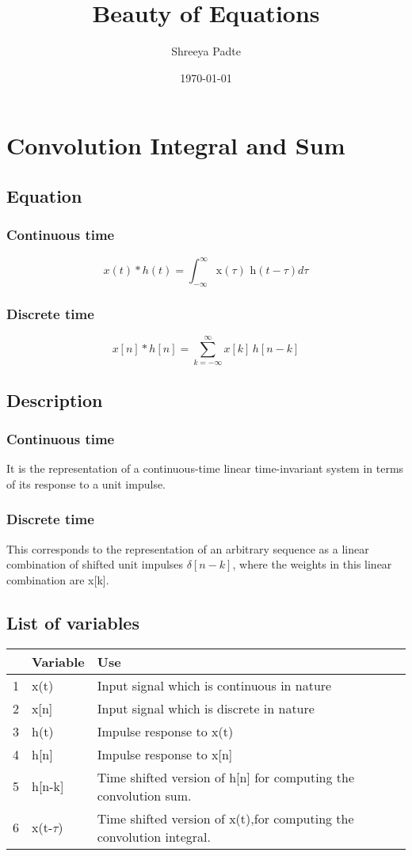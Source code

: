 

\title{Beauty of Equations}
\author{Shreeya Padte}
\date{\today}
\maketitle

\section{Convolution Integral and Sum}

\subsection{Equation}
\subsubsection{Continuous time}
$$x(t) * h(t) = \int_{-{\infty}}^{\infty}{\text{x}(\tau) \text{ h}(t - \tau)  d\tau} $$
\subsubsection{Discrete time}
$$x[n] * h[n] = \sum_{k=-{\infty}}^{\infty} x[k] \hspace{2pt} h[n-k] $$

\subsection{Description}
\subsubsection{Continuous time}
It is the representation of a continuous-time linear time-invariant system in terms of its response to a unit impulse.
\subsubsection{Discrete time}
This corresponds to the representation of an arbitrary sequence as a linear combination of shifted unit impulses $\delta[n-k]$, where the weights in this linear combination are x[k].


\subsection{List of variables}
\begin{tabular}{l|l|l}
\hline
     & Variable & Use  \\
\hline
    1 & x(t) & Input signal which is continuous in nature \\
    2 & x[n] & Input signal which is discrete in nature \\
    3 & h(t) & Impulse response to x(t) \\
    4 & h[n] & Impulse response to x[n] \\
    5 & h[n-k] & Time shifted version of h[n] for computing the convolution sum. \\
    6 & x(t-$\tau$) & Time shifted version of x(t),for computing the convolution integral. \\
\hline
\end{tabular}


